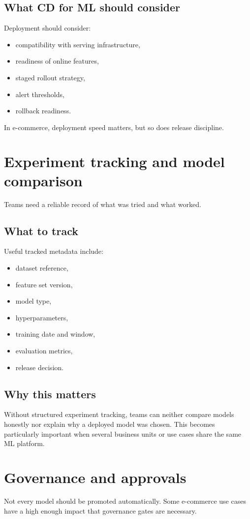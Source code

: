 \subsection{What CD for ML should consider}
Deployment should consider:
\begin{itemize}
  \item compatibility with serving infrastructure,
  \item readiness of online features,
  \item staged rollout strategy,
  \item alert thresholds,
  \item rollback readiness.
\end{itemize}

In e-commerce, deployment speed matters, but so does release discipline.

\section{Experiment tracking and model comparison}
Teams need a reliable record of what was tried and what worked.

\subsection{What to track}
Useful tracked metadata include:
\begin{itemize}
  \item dataset reference,
  \item feature set version,
  \item model type,
  \item hyperparameters,
  \item training date and window,
  \item evaluation metrics,
  \item release decision.
\end{itemize}

\subsection{Why this matters}
Without structured experiment tracking, teams can neither compare models honestly nor explain why a deployed model was chosen.
This becomes particularly important when several business units or use cases share the same ML platform.

\section{Governance and approvals}
Not every model should be promoted automatically.
Some e-commerce use cases have a high enough impact that governance gates are necessary.

